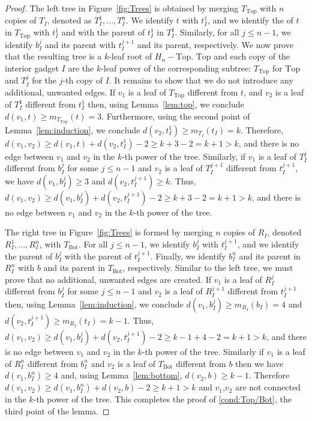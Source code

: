 \documentclass[11pt,letter]{article}
\theoremstyle{remark}
\newcommand{\T}{\text{Top}}
\newcommand{\B}{\text{Bot}}
\begin{document}
\begin{proof}
The left tree in Figure~\ref{fig:Trees} is obtained by merging $T_{\T}$ with $n$ copies of $T_I$, denoted as $T_I^1, \dots, T_I^n$. We identify $t$ with $t_I^1$, and we identify the
of $t$ in $T_{\T}$ with $t_I^1$ and with the parent of $t_I^1$ in $T_I^1$. Similarly, for all $j \leq n-1$, we identify $b_I^j$ and its parent with $t_I^{j+1}$ and its parent, respectively. We now prove that the resulting tree is a $k$-leaf root of $H_n - \T$.
$\T$ and each copy of the interior gadget $I$ are the $k$-leaf power of the corresponding subtree: $T_{\T}$ for $\T$ and $T_I^j$ for the $j$-th copy of $I$. It remains to show that we do not introduce any additional, unwanted edges. If $v_1$ is a leaf of $T_{\T}$ different from $t$, and $v_2$ is a leaf of $T_I^1$ different from $t^1_I$ then, using Lemma~\ref{lem:top}, we conclude $d(v_1,t) \geq m_{T_{\T}}(t) = 3$. Furthermore, using the second point of Lemma~\ref{lem:induction}, we conclude $d(v_2,t_I^1) \geq m_{T_I}(t_I) = k$. Therefore, $d(v_1,v_2) \geq d(v_1,t) + d(v_2,t_I^1)-2 \geq k+3-2 = k+1 > k$, and there is no edge between $v_1$ and $v_2$ in the $k$-th power of the tree. Similarly, if $v_1$ is a leaf of $T_I^j$ different from $b_I^j$ for some $j \leq n-1$ and $v_2$ is a leaf of $T_I^{j+1}$ different from $t_I^{j+1}$, we have $d(v_1,b_I^j) \geq 3$ and $d(v_2, t_I^{j+1}) \geq k$. Thus, $d(v_1,v_2) \geq d(v_1,b_I^j) + d(v_2, t_I^{j+1}) -2 \geq  k+3-2 = k+1 > k$, and there is no edge between $v_1$ and $v_2$ in the $k$-th power of the tree.

The right tree in Figure~\ref{fig:Trees} is formed by merging $n$ copies of $R_I$, denoted $R^1_I, \dots, R^n_I$, with $T_{\B}$. For all $j \leq n-1$, we identify $b_I^j$ with $t_I^{j+1}$,
and we identify the parent of $b_I^j$ with the parent of $t_I^{j+1}$. Finally, we identify $b_I^n$ and its parent in $R^n_I$ with $b$ and its parent in $T_{\B}$, respectively. Similar to the left tree, we must prove that no additional, unwanted edges are created. If $v_1$ is a leaf of $R^j_I$ different from $b_I^j$ for some $j \leq n-1$ and $v_2$ is a leaf of $R^{j+1}_I$ different from $t_I^{j+1}$ then, using Lemma~\ref{lem:induction}, we conclude $d(v_1,b_I^j) \geq m_{R_I}(b_I) = 4$ and $d(v_2, t_I^{j+1}) \geq m_{R_I}(t_I) = k-1$. Thus, $d(v_1,v_2) \geq d(v_1,b_I^j) + d(v_2, t_I^{j+1}) -2 \geq k-1 + 4-2 = k+1 > k$, and there is no edge between $v_1$ and $v_2$ in the $k$-th power of the tree. Similarly if $v_1$ is a leaf of $R^n_I$ different from $b_I^n$ and $v_2$ is a leaf of $T_{\B}$ different from $b$ then we have $d(v_1,b_I^n) \geq 4$ and, using Lemma~\ref{lem:bottom},  $d(v_2,b)  \geq k-1$. Therefore $d(v_1,v_2) \geq d(v_1,b_I^n) + d(v_2,b) -2 \geq  k+1>k$ and $v_1$,$v_2$ are not connected in the $k$-th power of the tree.
This completes the proof of \ref{cond:Top/Bot}, the third point of the lemma.


\end{proof}
\end{document}
